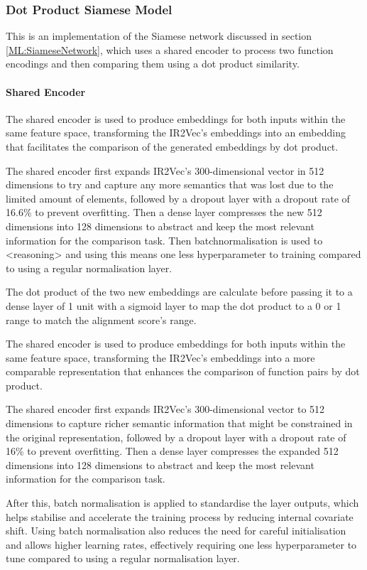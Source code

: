 \subsubsection{Dot Product Siamese Model}
This is an implementation of the Siamese network discussed in section \ref{ML:SiameseNetwork}, which uses a shared encoder to process two function encodings and then comparing them using a dot product similarity.

\paragraph{Shared Encoder} The shared encoder is used to produce embeddings for both inputs within the same feature space, transforming the IR2Vec's embeddings into an embedding that facilitates the comparison of the generated embeddings by dot product.

The shared encoder first expands IR2Vec's 300-dimensional vector in 512 dimensions to try and capture any more semantics that was lost due to the limited amount of elements, followed by a dropout layer with a dropout rate of 16.6\% to prevent overfitting. Then a dense layer compresses the new 512 dimensions into 128 dimensions to abstract and keep the most relevant information for the comparison task.  Then batchnormalisation is used to <reasoning> and using this means one less hyperparameter to training compared to using a regular normalisation layer.

The dot product of the two new embeddings are calculate before passing it to a dense layer of 1 unit with a sigmoid layer to map the dot product to a 0 or 1 range to match the alignment score's range.

The shared encoder is used to produce embeddings for both inputs within the same feature space, transforming the IR2Vec's embeddings into a more comparable representation that enhances the comparison of function pairs by dot product.

The shared encoder first expands IR2Vec's 300-dimensional vector to 512 dimensions to capture richer semantic information that might be constrained in the original representation, followed by a dropout layer with a dropout rate of 16\% to prevent overfitting. Then a dense layer compresses the expanded 512 dimensions into 128 dimensions to abstract and keep the most relevant information for the comparison task. 

After this, batch normalisation is applied to standardise the layer outputs, which helps stabilise and accelerate the training process by reducing internal covariate shift. Using batch normalisation also reduces the need for careful initialisation and allows higher learning rates, effectively requiring one less hyperparameter to tune compared to using a regular normalisation layer.


